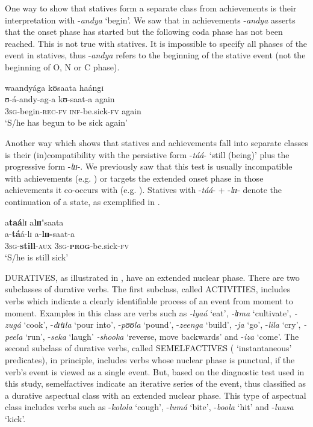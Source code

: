 \documentclass[output=paper,newtxmath,modfonts,nonflat,draftmode]{langsci/langscibook}
\begin{document}
One way to show that statives form a separate class from achievements is their interpretation with -\textit{andya} ‘begin’. We saw that in achievements -\textit{andya} asserts that the onset phase has started but the following coda phase has not been reached. This is not true with statives. It is impossible to specify all phases of the event in statives, thus -\textit{andya} refers to the beginning of the stative event (not the beginning of O, N or C phase).

\ea \label{ex:kanijo:12}
\glll waandyága      kʊsaata          haángɪ \\
ʊ-á-andy-ag-a kʊ-saat-a again\\
3\textsc{sg}-begin-\textsc{rec}-\textsc{fv} \textsc{inf}-be.sick-\textsc{fv} again\\ 
\glt ‘S/he has begun to be sick again’\\
\z

Another way which shows that statives and achievements fall into separate classes is their (in)compatibility with the persistive form -\textit{táá}- ‘still (being)’ plus the progressive form -\textit{lɪɪ}-. We previously saw that this test is usually incompatible with achievements (e.g. ) or targets the extended onset phase in those achievements it co-occurs with (e.g. ). Statives with -\textit{táá}- + -\textit{lɪɪ}- denote the continuation of a state, as exemplified in . 

\ea \label{ex:kanijo:13}
\glll a\textbf{taá}lɪ      a\textbf{l}\textbf{ɪɪ}\textbf{\'{}}saata\\
a-\textbf{tá}á-lɪ             a-\textbf{lɪɪ}\textbf{-}saat-a\\
3\textsc{sg}-\textbf{still}-\textsc{aux} 3\textsc{sg}-\textbf{\textsc{prog}}-be.sick-\textsc{fv}\\
\glt ‘S/he is still sick’
\z

DURATIVES, as illustrated in , have an extended nuclear phase. There are two subclasses of durative verbs. The first subclass, called ACTIVITIES, includes verbs which indicate a clearly identifiable process of an event from moment to moment. Examples in this class are verbs such as \textit{-lyaá} ‘eat’, \textit{-lɪ}\textit{ma} ‘cultivate’, \textit{-zugá} ‘cook’, -\textit{dɪ}\textit{tɪ}\textit{la} ‘pour into’, -\textit{pʊʊ}\textit{la} ‘pound’, -\textit{zeenga} ‘build’, \textit{-ja} ‘go’, -\textit{lila} ‘cry’, \textit{-peela} ‘run’, -\textit{seka} ‘laugh’ \textit{-shooka} ‘reverse, move backwards’ and -\textit{iza} ‘come’. The second subclass of durative verbs, called SEMELFACTIVES ( ‘instantaneous’ predicates), in principle, includes verbs whose nuclear phase is punctual, if the verb’s event is viewed as a single event. But, based on the diagnostic test used in this study, semelfactives indicate an iterative series of the event, thus classified as a durative aspectual class with an extended nuclear phase. This type of aspectual class includes verbs such as -\textit{kolola} ‘cough’, -\textit{lumá} ‘bite’, -\textit{boola} ‘hit’ and -\textit{luusa} ‘kick’. 
\end{document}
